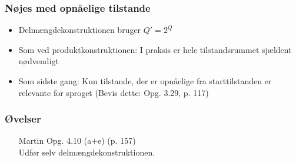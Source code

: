 \begin{frame}
\frametitle{Nøjes med opnåelige tilstande}
\begin{itemize}[<+->]
\item Delmængdekonstruktionen bruger $Q' = 2^Q$
\item Som ved produktkonstruktionen: I praksis er hele tilstandsrummet
  sjældent nødvendigt
\item Som sidste gang: Kun tilstande, der er opnåelige fra
  starttilstanden er relevante for sproget (Bevis dette: Opg. 3.29, p. 117)
\end{itemize}
\end{frame}
\begin{frame}
\frametitle{Øvelser}
\begin{itemize}
\item [Martin] Opg. 4.10 (a+e) (p. 157)\\
Udfør selv delmængdekonstruktionen.
\end{itemize}
\end{frame}


